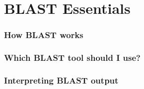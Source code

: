 \documentclass{beamer}
\begin{document}
  \section{BLAST Essentials}
  
    \begin{frame}
     \frametitle{How BLAST works}
    \end{frame}
   
    \begin{frame}
     \frametitle{Which BLAST tool should I use?}
    \end{frame}
     
    \begin{frame}
     \frametitle{Interpreting BLAST output}
    \end{frame}


  \section{}
  \begin{frame}
  \end{frame}

\end{document}
